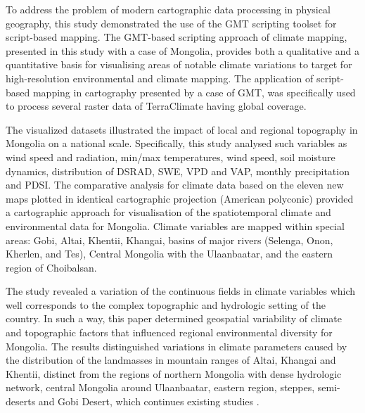 \documentclass[geosciences,article,submit,pdftex,moreauthors]{Definitions/mdpi}
\begin{document}
To address the problem of modern cartographic data processing in physical geography, this study demonstrated the use of the GMT scripting toolset for script-based mapping. The GMT-based scripting approach of climate mapping, presented in this study with a case of Mongolia, provides both a qualitative and a quantitative basis for visualising areas of notable climate variations to target for high-resolution environmental and climate mapping. The application of script-based mapping in cartography presented by a case of GMT, was specifically used to process several raster data of TerraClimate having global coverage. 

The visualized datasets illustrated the impact of local and regional topography in Mongolia on a national scale. Specifically, this study analysed such variables as wind speed and radiation, min/max temperatures, wind speed, soil moisture dynamics, distribution of DSRAD, SWE, VPD and VAP, monthly precipitation and PDSI. The comparative analysis for climate data based on the eleven new maps plotted in identical cartographic projection (American polyconic) provided a cartographic approach for visualisation of the spatiotemporal climate and environmental data for Mongolia. Climate variables are mapped within special areas: Gobi, Altai, Khentii, Khangai, basins of major rivers (Selenga, Onon, Kherlen, and Tes), Central Mongolia with the Ulaanbaatar, and the eastern region of Choibalsan.

The study revealed a variation of the continuous fields in climate variables which well corresponds to the complex topographic and hydrologic setting of the country. In such a way, this paper determined geospatial variability of climate and topographic factors that influenced regional environmental diversity for Mongolia. The results distinguished variations in climate parameters caused by the distribution of the landmasses in mountain ranges of Altai, Khangai and Khentii, distinct from the regions of northern Mongolia with dense hydrologic network, central Mongolia around Ulaanbaatar, eastern region, steppes, semi-deserts and Gobi Desert, which continues existing studies \cite{Cook,Ulaankhuu}. 
\end{document}
